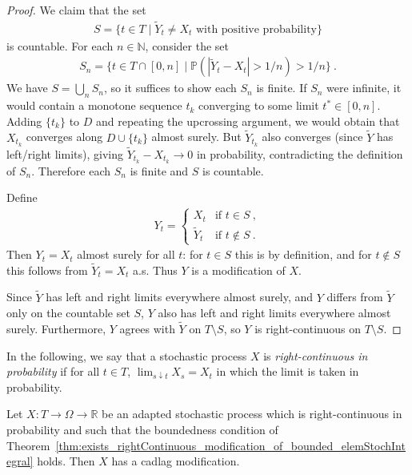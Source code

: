 \begin{proof}
  We claim that the set
  \begin{align*}
    S = \{t \in T \mid \tilde{Y}_t \ne X_t \text{ with positive probability}\}
  \end{align*}
  is countable.
  For each $n \in \mathbb{N}$, consider the set
  \begin{align*}
    S_n = \{t \in T \cap [0, n] \mid \mathbb{P}(|\tilde{Y}_t - X_t| > 1/n) > 1/n\}
    \:.
  \end{align*}
  We have $S = \bigcup_n S_n$, so it suffices to show each $S_n$ is finite.
  If $S_n$ were infinite, it would contain a monotone sequence $t_k$ converging to some limit
  $t^* \in [0, n]$. Adding $\{t_k\}$ to $D$ and repeating the upcrossing argument, we would obtain
  that $X_{t_k}$ converges along $D \cup \{t_k\}$ almost surely. But $\tilde{Y}_{t_k}$ also converges
  (since $\tilde{Y}$ has left/right limits), giving $\tilde{Y}_{t_k} - X_{t_k} \to 0$ in probability,
  contradicting the definition of $S_n$. Therefore each $S_n$ is finite and $S$ is countable.

  Define
  \begin{align*}
    Y_t = \begin{cases} X_t & \text{if } t \in S \:, \\ \tilde{Y}_t & \text{if } t \notin S \:. \end{cases}
  \end{align*}
  Then $Y_t = X_t$ almost surely for all $t$: for $t \in S$ this is by definition, and for
  $t \notin S$ this follows from $\tilde{Y}_t = X_t$ a.s. Thus $Y$ is a modification of $X$.

  Since $\tilde{Y}$ has left and right limits everywhere almost surely, and $Y$ differs from
  $\tilde{Y}$ only on the countable set $S$, $Y$ also has left and right limits everywhere almost surely.
  Furthermore, $Y$ agrees with $\tilde{Y}$ on $T \setminus S$, so $Y$ is right-continuous on $T \setminus S$.
\end{proof}

In the following, we say that a stochastic process $X$ is \emph{right-continuous in probability} if for all $t \in T$, $\lim_{s \downarrow t} X_s = X_t$ in which the limit is taken in probability.

\begin{corollary}\label{cor:exists_caldag_modification}
  \leanok
Let $X : T \to \Omega \to \mathbb{R}$ be an adapted stochastic process which is right-continuous in probability and such that the boundedness condition of Theorem~\ref{thm:exists_rightContinuous_modification_of_bounded_elemStochIntegral} holds.
Then $X$ has a cadlag modification.
\end{corollary}

